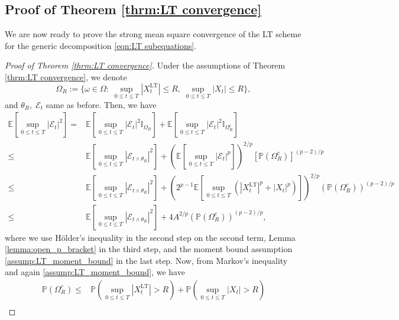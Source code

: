 \documentclass[a4paper,12pt]{article}
\numberwithin{equation}{section}
\theoremstyle{plain}
\theoremstyle{definition}
\begin{document}
\begin{appendix}
\subsection{Proof of Theorem \ref{thrm:LT convergence}}
We are now ready to prove the strong mean square convergence of the LT scheme for the generic decomposition \eqref{eqn:LT subequations}.
\begin{proof}[Proof of Theorem \ref{thrm:LT convergence}] Under the assumptions of Theorem \ref{thrm:LT convergence}, we denote 
\begin{equation*}
    \Omega_R:=\{\omega\in \Omega: \; \sup_{0\leq t\leq T}|X^{\textrm{LT}}_t|\leq R,\; \sup_{0\leq t \leq T}|X_t|\leq R\},
\end{equation*}
and $\theta_R,\;\mathcal{E}_t$ same as before. Then, we have
    \begin{align}
        \mathbb{E}\left[ \sup _{0 \leq t \leq T}\left|\mathcal{E}_t\right|^2\right]=&\mathbb{E} \left[\sup _{0 \leq t \leq T}\left|\mathcal{E}_t\right|^2 \mathbb{I}_{\Omega_R}\right]+\mathbb{E} \left[\sup _{0 \leq t \leq T}\left|\mathcal{E}_t\right|^2 \mathbb{I}_{\Omega_R^c}\right]\nonumber\\
        \leq& \mathbb{E}\left[ \sup _{0 \leq t \leq T}\left|\mathcal{E}_{t \wedge \theta_R}\right|^2\right]+\left(\mathbb{E}\left[\sup _{0 \leq t \leq T}\left|\mathcal{E}_t\right|^p\right]\right)^{2 / p}\left[\mathbb{P}\left(\Omega_R^c\right)\right]^{(p-2) / p}\nonumber\\
        \leq& \mathbb{E}\left[\sup _{0 \leq t \leq T}\left|\mathcal{E}_{t \wedge \theta_R}\right|^2\right]+\left(2^{p-1} \mathbb{E} \left[\sup _{0 \leq t \leq T}\left(\left|X^{\textrm{LT}}_t\right|^p+\left|X_t\right|^p\right)\right]\right)^{2 / p}\left(\mathbb{P}\left(\Omega_R^c\right)\right)^{(p-2) / p}\nonumber\\
        \leq& \mathbb{E}\left[\sup _{0 \leq t \leq T}\left|\mathcal{E}_{t \wedge \theta_R}\right|^2\right]+4 A^{2 / p}\left(\mathbb{P}\left(\Omega_R^c\right)\right)^{(p-2) / p}\label{eqn:L2 bound decompose},
    \end{align}
    where we use H\"older's inequality in the second step on the second term, Lemma \ref{lemma:open_p_bracket} in the third step, and the moment bound assumption \eqref{assump:LT_moment_bound} in the last step. Now, from Markov's inequality and again \eqref{assump:LT_moment_bound}, we have 
    \begin{align}
    \mathbb{P}\left(\Omega_R^c\right) \leq& \mathbb{P}\left(\sup _{0 \leq t \leq T}\left|X^{\textrm{LT}}_t\right|>R\right)+\mathbb{P}\left(\sup _{0 \leq t \leq T}\left|X_t\right|>R\right)\nonumber\\

\end{align}
\end{proof}
\end{appendix}
\end{document}
